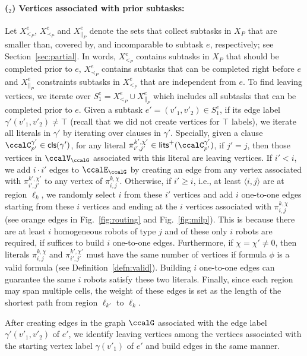 \documentclass[Afour,sageh,times]{sagej}
\newcounter{mycounter}
\newcommand{\clause}[1]{\mathsf{cls}(#1)}
\newcommand{\ag}[2]{\langle#1,#2\rangle}
\renewcommand{\ap}[3]{\mathcal{\pi}_{{#1},{#2}}^{#3}}
\begin{document}
\paragraph{($_2$) Vertices associated with prior subtasks:}\label{sec:b} Let $X^e_{<_{P}}$, $X^e_{\prec_{P}}$ and $X^e_{\|_{P}}$ denote the sets that collect subtasks in $X_{P}$ that are  smaller than, covered by, and incomparable to subtask $e$, respectively; see Section~\ref{sec:partial}. In words, $X^e_{<_{P}}$ contains subtasks in $X_P$ that should be completed prior to $e$, $X^e_{\prec_{P}}$ contains subtasks that can be completed right before $e$  and $X^e_{\|_{P}}$ constraints subtasks in  $X^e_{<_P}$ that are independent from $e$. To find leaving vertices, we iterate over $S_1^e = X^e_{<_{P}} \cup X^e_{\|_{P}}$ which includes all subtasks that can be completed prior to $e$.
Given a subtask $e' = (v'_1, v'_2) \in S_1^e$, if its edge label $\gamma'(v'_1, v'_2) \not=\top$ (recall that we did not create vertices for $\top$ labels), we iterate all literals in $\gamma'$ by iterating over clauses in $\gamma'$. Specially, given a clause $\ccalC^{\gamma'}_{p'} \in \clause{\gamma'}$, for any literal $\ap{i'}{j'}{k',\chi'} \in\mathsf{lits}^+(\ccalC^{\gamma'}_{p'})$, if $j'=j$, then those vertices in $\ccalV_\ccalG$ associated with this literal are leaving vertices. If $i'<i$, we add $i\cdot  i'$ edges to $\ccalE_\ccalG$ by creating an edge from any vertex associated with $\ap{i'}{j'}{k',\chi'}$ to any vertex of $\ap{i}{j}{k,\chi}$. Otherwise, if $i' \geq  i$, i.e., at least $\ag{i}{j}$ are at region $\ell_k$, we randomly select $i$ from these $i'$ vertices and add $i$ one-to-one edges starting from these $i$ vertices and ending at the $i$ vertices associated with $\ap{i}{j}{k,\chi}$ (see orange edges in Fig.~\ref{fig:routing} and Fig.~\ref{fig:milp}). This is because there are at least $i$ homogeneous robots of type $j$ and of these only $i$ robots are required, if suffices to build $i$ one-to-one edges. Furthermore, if $\chi=\chi'\neq0$, then literals $\ap{i}{j}{k,\chi}$ and $\ap{i'}{j'}{k',\chi'}$ must have the same number of vertices if formula $\phi$ is a valid formula (see Definition~\ref{defn:valid}). Building $i$ one-to-one edges can guarantee the same  $i$ robots satisfy these two literals. Finally, since each region may span multiple cells, the weight of these edges is set as the length of the shortest path from region  $\ell_{k'}$ to $\ell_k$.

After creating edges in the graph $\ccalG$ associated with the edge label  $\gamma'(v'_1,v'_2)$ of $e'$, we identify  leaving vertices  among the vertices associated with the starting vertex label $\gamma(v'_1)$ of $e'$ and build edges in the same manner. %
\end{document}
